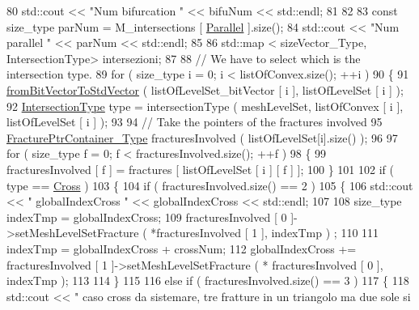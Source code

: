 \begin{DoxyCode}
80         std::cout << \textcolor{stringliteral}{"Num bifurcation "} << bifuNum << std::endl;
81 
82 
83         \textcolor{keyword}{const} size\_type parNum = M\_intersections [ \hyperlink{classFractureIntersect_a9a4e4a784fa4c8e359767ed543f89dc5ad91760e1506b52a828bc401490f7c92b}{Parallel} ].size();
84         std::cout << \textcolor{stringliteral}{"Num parallel "} << parNum << std::endl;
85 
86         std::map < sizeVector\_Type, IntersectionType> intersezioni;
87 
88         \textcolor{comment}{// We have to select which is the intersection type.}
89         \textcolor{keywordflow}{for} ( size\_type i = 0; i < listOfConvex.size(); ++i )
90         \{
91            \hyperlink{UsefulFunctions_8h_a0ea0b08a12a1e6a94718cf3bcd60edeb}{fromBitVectorToStdVector} ( listOfLevelSet\_bitVector [ i ], 
      listOfLevelSet [ i ] );
92            \hyperlink{classFractureIntersect_a9a4e4a784fa4c8e359767ed543f89dc5}{IntersectionType} type = intersectionType ( meshLevelSet, listOfConvex [ i ], 
      listOfLevelSet [ i ] );
93 
94            \textcolor{comment}{// Take the pointers of the fractures involved}
95            \hyperlink{FractureHandler_8h_a2f0b57e18ecf89912d7de0c87158009e}{FracturePtrContainer\_Type} fracturesInvolved ( listOfLevelSet[i].size() 
      );
96            
97            \textcolor{keywordflow}{for} ( size\_type f = 0; f < fracturesInvolved.size(); ++f )
98            \{
99                 fracturesInvolved [ f ] = fractures [ listOfLevelSet [ i ] [ f ] ];
100            \}
101 
102            \textcolor{keywordflow}{if} ( type == \hyperlink{classFractureIntersect_a9a4e4a784fa4c8e359767ed543f89dc5a743fef1af81c0e61412fafb9438b380e}{Cross} )
103            \{
104                \textcolor{keywordflow}{if} ( fracturesInvolved.size() == 2 )
105                 \{
106                     std::cout << \textcolor{stringliteral}{" globalIndexCross "} << globalIndexCross << std::endl;
107 
108                     size\_type indexTmp = globalIndexCross;
109                     fracturesInvolved [ 0 ]->setMeshLevelSetFracture ( *fracturesInvolved [ 1 ], indexTmp )
      ;
110 
111                     indexTmp = globalIndexCross + crossNum;
112                     globalIndexCross += fracturesInvolved [ 1 ]->setMeshLevelSetFracture ( *
      fracturesInvolved [ 0 ], indexTmp );
113 
114                 \}
115 
116                \textcolor{keywordflow}{else} \textcolor{keywordflow}{if} ( fracturesInvolved.size() == 3 )
117                \{
118                    std::cout << \textcolor{stringliteral}{" caso cross da sistemare, tre fratture in un triangolo ma due sole si
}
\end{DoxyCode}

